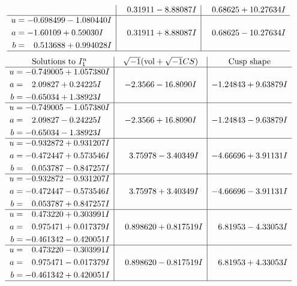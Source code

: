 \documentclass[1p]{elsarticle_modified}
\theoremstyle{definition}
\newcommand{\I}{\sqrt{-1}}
\begin{document}
$$\begin{array}{c|c|c}
 & \phantom{-}0.31911 - 8.88087 I & \phantom{-}0.68625 + 10.27634 I \\ \hline\begin{aligned}
u &= -0.698499 - 1.080440 I \\
a &= -1.60109 + 0.59030 I \\
b &= \phantom{-}0.513688 + 0.994028 I\end{aligned}
 & \phantom{-}0.31911 + 8.88087 I & \phantom{-}0.68625 - 10.27634 I\\
 \hline 
 \end{array}$$\newpage$$\begin{array}{c|c|c}  
\text{Solutions to }I^u_{1}& \I (\text{vol} + \sqrt{-1}CS) & \text{Cusp shape}\\
 \hline 
\begin{aligned}
u &= -0.749005 + 1.057380 I \\
a &= \phantom{-}2.09827 + 0.24225 I \\
b &= -0.65034 + 1.38923 I\end{aligned}
 & -2.3566 - 16.8090 I & -1.24843 + 9.63879 I \\ \hline\begin{aligned}
u &= -0.749005 - 1.057380 I \\
a &= \phantom{-}2.09827 - 0.24225 I \\
b &= -0.65034 - 1.38923 I\end{aligned}
 & -2.3566 + 16.8090 I & -1.24843 - 9.63879 I \\ \hline\begin{aligned}
u &= -0.932872 + 0.931207 I \\
a &= -0.472447 + 0.573546 I \\
b &= \phantom{-}0.053787 - 0.847257 I\end{aligned}
 & \phantom{-}3.75978 - 3.40349 I & -4.66696 + 3.91131 I \\ \hline\begin{aligned}
u &= -0.932872 - 0.931207 I \\
a &= -0.472447 - 0.573546 I \\
b &= \phantom{-}0.053787 + 0.847257 I\end{aligned}
 & \phantom{-}3.75978 + 3.40349 I & -4.66696 - 3.91131 I \\ \hline\begin{aligned}
u &= \phantom{-}0.473220 + 0.303991 I \\
a &= \phantom{-}0.975471 + 0.017379 I \\
b &= -0.461342 - 0.420051 I\end{aligned}
 & \phantom{-}0.898620 + 0.817519 I & \phantom{-}6.81953 - 4.33053 I \\ \hline\begin{aligned}
u &= \phantom{-}0.473220 - 0.303991 I \\
a &= \phantom{-}0.975471 - 0.017379 I \\
b &= -0.461342 + 0.420051 I\end{aligned}
 & \phantom{-}0.898620 - 0.817519 I & \phantom{-}6.81953 + 4.33053 I\\
 \hline 
 \end{array}$$\newpage\newpage\renewcommand{\arraystretch}{1}
\end{document}
